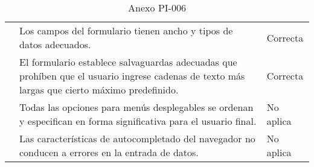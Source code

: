 \begin{table}[htpb]
\begin{tabularx}{\textwidth}{|l|X|l|}
                                                                                & Los campos del formulario tienen ancho y tipos de datos adecuados.                                                                                        & Correcta            \\ \cline{2-3} 
                                                                                & El formulario establece salvaguardas adecuadas que prohíben que el usuario ingrese cadenas de texto más largas que cierto máximo predefinido.             & Correcta            \\ \cline{2-3} 
                                                                                & Todas las opciones para menús desplegables se ordenan y especifican en forma significativa para el usuario final.                                         & No aplica           \\ \cline{2-3} 
                                                                                & Las características de autocompletado del navegador no conducen a errores en la entrada de datos.                                                         & No aplica           \\ \hline
\end{tabularx}
\caption{Anexo PI-006}
\end{table}

